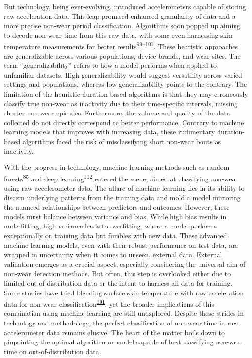 \documentclass[
  10pt,
]{scrbook}
\begin{document}
But technology, being ever-evolving, introduced accelerometers capable
of storing raw acceleration data. This leap promised enhanced
granularity of data and a more precise non-wear period classification.
Algorithms soon popped up aiming to decode non-wear time from this raw
data, with some even harnessing skin temperature measurements for better
results\textsuperscript{\protect\hyperlink{ref-duncan_wear-time_2018}{99}--\protect\hyperlink{ref-zhou_classification_2015}{101}}.
These heuristic approaches are generalizable across various populations,
device brands, and wear-sites. The term ``generalizability'' refers to
how a model performs when applied to unfamiliar datasets. High
generalizability would suggest versatility across varied settings and
populations, whereas low generalizability points to the contrary. The
limitation of the heuristic duration-based algorithms is that they may
erroneously classify true non-wear as inactivity due to their
time-specific intervals, missing shorter non-wear episodes. Furthermore,
the volume and quality of the data collected do not directly correspond
to better performance. Contrary to machine learning models that improves
with increasing data, these rudimentary duration-based algorithms faced
the risk of misclassifying short non-wear bouts as inactivity.

With the progress in technology, machine learning methods such as random
forests\textsuperscript{\protect\hyperlink{ref-sundararajan_sleep_2021}{85}}
and deep
learning\textsuperscript{\protect\hyperlink{ref-syed_novel_2021}{102}}
entered the scene, aimed at classifying non-wear using raw accelerometer
data. The allure of machine learning lies in its ability to discern
underlying patterns from the training data and mold a model mirroring
the nuanced relationships between predictors and outcomes. However,
these models must balance between variance and bias. While high bias
results in underfitting, high variance leads to overfitting, where a
model performs exceptionally on training data but fumbles with new data.
These advanced machine learning models, even with their robust
performance on test data, are wrapped in uncertainty when it comes to
unseen, external data. External validation emerges as a crucial aspect,
especially considering the universal aim of non-wear detection methods.
But often, this step is overlooked either due to limited
out-of-distribution data or the intent to harness all data for training.
Some studies have tried blending surface skin temperature with raw
acceleration data for non-wear
classification\textsuperscript{\protect\hyperlink{ref-zhou_classification_2015}{101}},
yet the broader implications of this combination using machine learning
are still unexplored. Despite these strides in technology and
methodology, the perfect classification of non-wear time in raw
accelerometer data remains elusive. The heart of the matter boils down
to pinpointing the optimal algorithm or model capable of best
classifying non-wear time on out-of-distribution data.
\end{document}
